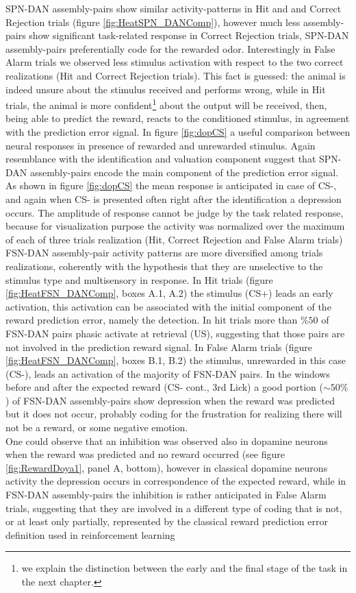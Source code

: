 SPN-DAN assembly-pairs show similar activity-patterns in Hit and and Correct Rejection trials (figure \ref{fig:HeatSPN_DANComp}), however much less assembly-pairs show significant task-related response in Correct Rejection trials, SPN-DAN assembly-pairs preferentially code for the rewarded odor. Interestingly in False Alarm trials we observed less stimulus activation with respect to the two correct realizations (Hit and Correct Rejection trials). This fact is guessed: the animal is indeed unsure about the stimulus received and performs wrong, while in Hit trials, the animal is more confident\footnote{we explain the distinction between the early and the final stage of the task in the next chapter.} about the output will be received, then, being able to predict the reward, reacts to the conditioned stimulus, in agreement with the prediction error signal. In figure \ref{fig:dopCS} a useful comparison between neural responses in presence of rewarded and unrewarded stimulus. Again resemblance with the identification and valuation component suggest that SPN-DAN assembly-pairs encode the main component of the prediction error signal. As shown in figure \ref{fig:dopCS} the mean response is anticipated in case of CS-, and again when CS- is presented often right after the identification a depression occurs. The amplitude of response cannot be judge by the task related response, because for visualization purpose the activity was normalized over the maximum of each of three trials realization (Hit, Correct Rejection and False Alarm trials)\\FSN-DAN assembly-pair activity patterns are more diversified among trials realizations, coherently with the hypothesis that they are unselective to the stimulus type and multisensory in response. In Hit trials (figure \ref{fig:HeatFSN_DANComp}, boxes A.1, A.2) the stimulus (CS+) leads an early activation, this activation can be associated with the initial component of the reward prediction error, namely the detection. In hit trials more than $\% 50$ of FSN-DAN pairs phasic activate at retrieval (US), suggesting that those pairs are not involved in the prediction reward signal. In False Alarm trials (figure \ref{fig:HeatFSN_DANComp}, boxes B.1, B.2) the stimulus, unrewarded in this case (CS-), leads an activation of the majority of FSN-DAN pairs. In the windows before and after the expected reward (CS- cont., 3rd Lick) a good portion ($\sim50\%$) of FSN-DAN assembly-pairs show depression when the reward was predicted but it does not occur, probably coding for the frustration for realizing there will not be a reward, or some negative emotion.\\One could observe that an inhibition was observed also in dopamine neurons when the reward was predicted and no reward occurred (see figure \ref{fig:RewardDoya1}, panel A, bottom), however in classical dopamine neurons activity the depression occurs in correspondence of the expected reward, while in FSN-DAN assembly-pairs the inhibition is rather anticipated in False Alarm trials, suggesting that they are involved in a different type of coding that is not, or at least only partially, represented by the classical reward prediction error definition used in reinforcement learning 